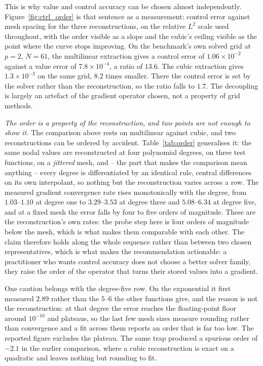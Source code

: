 \documentclass[conference]{IEEEtran}
\begin{document}
This is why value and control accuracy can be chosen almost independently. Figure~\ref{fig:ctrl_order}
is that sentence as a measurement: control error against mesh spacing for the three reconstructions,
on the relative $L^2$ scale used throughout, with the order visible as a slope and the cubic's ceiling
visible as the point where the curve stops improving. On the benchmark's own
solved grid at $p=2$, $N=61$, the multilinear extraction gives a control error of
$1.06\times10^{-2}$ against a value error of $7.8\times10^{-4}$, a ratio of $13.6$. The cubic
extraction gives $1.3\times10^{-3}$ on the same grid, $8.2$ times smaller. There the control
error is set by the solver rather than the reconstruction, so the ratio falls to $1.7$. The
decoupling is largely an artefact of the gradient operator chosen, not a property of grid methods.

\emph{The order is a property of the reconstruction, and two points are not enough to show it.} The
comparison above rests on multilinear against cubic, and two reconstructions can be ordered by
accident. Table~\ref{tab:order} generalises it: the same nodal values are reconstructed at four
polynomial degrees, on three test functions, on a \emph{jittered} mesh, and -- the part that makes the
comparison mean anything -- every degree is differentiated by an identical rule, central differences
on its own interpolant, so nothing but the reconstruction varies across a row. The measured gradient
convergence rate rises monotonically with the degree, from $1.03$--$1.10$ at degree one to
$3.29$--$3.53$ at degree three and $5.08$--$6.34$ at degree five, and at a fixed mesh the error falls
by four to five orders of magnitude. These are the reconstruction's own rates: the probe step here
is four orders of magnitude below the mesh, which is what makes them comparable with each other. The
claim therefore holds along the whole sequence rather than
between two chosen representatives, which is what makes the recommendation actionable: a practitioner
who wants control accuracy does not choose a better solver family, they raise the order of the
operator that turns their stored values into a gradient.



One caution belongs with the degree-five row. On the exponential it first measured $2.89$ rather than
the $5$--$6$ the other functions give, and the reason is not the reconstruction: at that degree the
error reaches the floating-point floor around $10^{-10}$ and plateaus, so the last few mesh sizes
measure rounding rather than convergence and a fit across them reports an order that is far too low.
The reported figure excludes the plateau. The same trap produced a spurious order of $-2.1$ in the
earlier comparison, where a cubic reconstruction is exact on a quadratic and leaves nothing but
rounding to fit.
\end{document}
